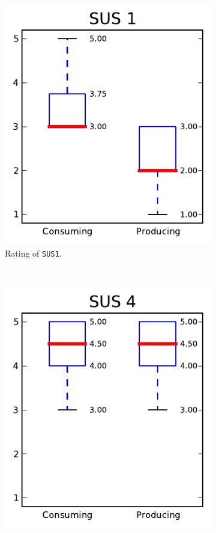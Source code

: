 \begin{figure}
\centering
\begin{subfigure}[t]{0.32\textwidth}
\centering
\includegraphics[width=\textwidth]{img/graphs/4a_00.pdf}
\caption{Rating of \texttt{SUS1}.}
\end{subfigure}%
~
\begin{subfigure}[t]{0.32\textwidth}
\centering
\includegraphics[width=\textwidth]{img/graphs/4a_03.pdf}

\end{subfigure}
\end{figure}

